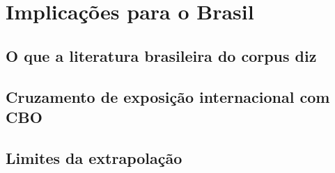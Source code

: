 \chapter{Implicações para o Brasil}\label{cap:brasil}

\section{O que a literatura brasileira do corpus diz}
\section{Cruzamento de exposição internacional com CBO}
\section{Limites da extrapolação}
